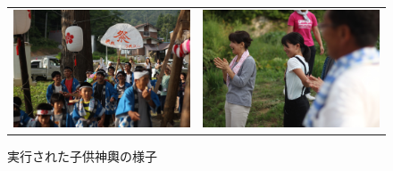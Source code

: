 \documentclass[a4paper]{jsarticle}
\begin{document}
\begin{figure}[H]
  \begin{center}
    \begin{tabular}{cc}

    \begin{minipage}{0.5\hsize}
	\includegraphics[width=\hsize]{./images/IMG_0755.JPG}
    \end{minipage}
    &
    \begin{minipage}{0.5\hsize}
      \includegraphics[width=\hsize]{./images/IMG_0747.JPG}
    \end{minipage}

  \end{tabular}
    \caption{実行された子供神輿の様子}
    \label{fig:tmu_hino_yokonarabi}
  \end{center}
\end{figure}
\\
\end{document}
